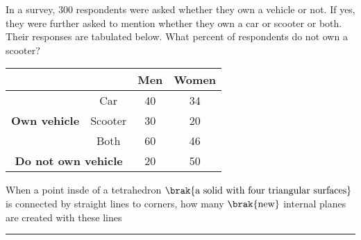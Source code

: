     \item In a survey, $300$ respondents were asked whether they own a vehicle or not. If yes, they were further asked to mention whether they own a car or scooter or both. Their responses are tabulated below. What percent of respondents do not own a scooter?
        \begin{table}[h!]
            \centering
            \begin{tabular}{|c|c|c|c|}
                \hline
                & & \textbf{Men} & \textbf{Women} \\
                \hline
                \multirow{3}{*}{\textbf{Own vehicle}} & Car & 40 & 34 \\
                \cline{2-4}
                & Scooter & 30 & 20 \\
                \cline{2-4}
                & Both & 60 & 46 \\
                \hline
                \multicolumn{2}{|c|}{\textbf{Do not own vehicle}} & 20 & 50 \\

                \hline
            \end{tabular}
        \end{table}
    \item When a point insde of a tetrahedron $\brak{\text{a solid with four triangular surfaces}}$ is connected by straight lines to corners, how many $\brak{\text{new}}$ internal planes are created with these lines \rule{2cm}{0.2pt}

